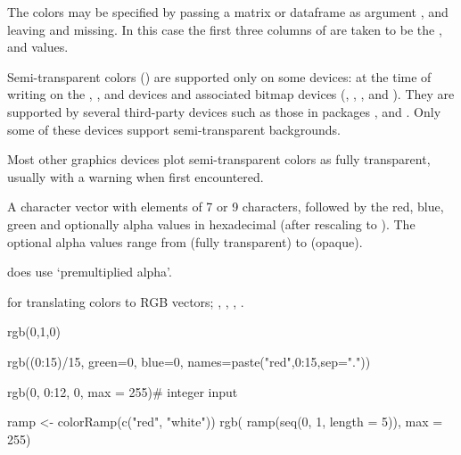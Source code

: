 %
\begin{Details}\relax
The colors may be specified by passing a matrix or dataframe as argument
, and leaving  and  missing.
In this case the first three columns of  are taken to be
the ,  and  values.

Semi-transparent colors () are supported only on
some devices: at the time of writing on the ,
,  and  devices and
associated bitmap devices (, , ,
 and ). They are supported by several
third-party devices such as those in packages ,
 and .  Only some of these
devices support semi-transparent backgrounds.

Most other graphics devices plot semi-transparent colors as fully
transparent, usually with a warning when first encountered.
\end{Details}
%
\begin{Value}
A character vector with elements of 7 or 9 characters, 
followed by the red, blue, green and optionally alpha values in
hexadecimal (after rescaling to ).  The optional alpha
values range from  (fully transparent) to  (opaque).

\R{} does  use `premultiplied alpha'.
\end{Value}
%
\begin{SeeAlso}\relax
{} for translating \R{} colors to RGB vectors;
, , ,
.
\end{SeeAlso}
%
\begin{Examples}
\begin{ExampleCode}
rgb(0,1,0)

rgb((0:15)/15, green=0, blue=0, names=paste("red",0:15,sep="."))

rgb(0, 0:12, 0, max = 255)# integer input

ramp <- colorRamp(c("red", "white"))
rgb( ramp(seq(0, 1, length = 5)), max = 255)
\end{ExampleCode}
\end{Examples}
